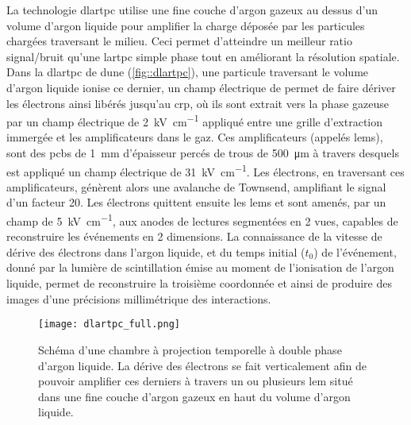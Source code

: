     La technologie \gls{dlartpc} utilise une fine couche d'argon gazeux au dessus d'un volume d'argon liquide pour amplifier la charge déposée par les particules chargées traversant le milieu. Ceci permet d'atteindre un meilleur ratio signal/bruit qu'une \gls{lartpc} simple phase tout en améliorant la résolution spatiale. Dans la \gls{dlartpc} de \gls{dune} (\autoref{fig::dlartpc}), une particule traversant le volume d'argon liquide ionise ce dernier, un champ électrique de \driftfield{} permet de faire dériver les électrons ainsi libérés jusqu'au \gls{crp}, où ils sont extrait vers la phase gazeuse par un champ électrique de \SI{2}{\kilo\volt\per\centi\meter} appliqué entre une grille d'extraction immergée et les amplificateurs dans le gaz. Ces amplificateurs (appelés \glspl{lem}), sont des \glspl{pcb} de \SI{1}{\milli\meter} d'épaisseur percés de trous de \SI{500}{\micro\meter} à travers desquels est appliqué un champ électrique de  \SI{31}{\kilo\volt\per\centi\meter}. Les électrons, en traversant ces amplificateurs, génèrent alors une avalanche de Townsend, amplifiant le signal d'un facteur 20. Les électrons quittent ensuite les \glspl{lem} et sont amenés, par un champ de  \SI{5}{\kilo\volt\per\centi\meter}, aux anodes de lectures segmentées en 2 vues, capables de reconstruire les événements en 2 dimensions. La connaissance de la vitesse de dérive des électrons dans l'argon liquide, et du temps initial ($t_0$) de l'événement, donné par la lumière de scintillation émise au moment de l'ionisation de l'argon liquide, permet de reconstruire la troisième coordonnée et ainsi de produire des images d'une précisions millimétrique des interactions.

    \begin{figure}[!htb]
      \centering
      \texttt{[image: dlartpc\_full.png]}
      \caption[Schéma d'une chambre à projection temporelle à double phase d'argon liquide]{\label{fig::dlartpc}Schéma d'une chambre à projection temporelle à double phase d'argon liquide. La dérive des électrons se fait verticalement afin de pouvoir amplifier ces derniers à travers un ou plusieurs \acrfull{lem} situé dans une fine couche d'argon gazeux en haut du volume d'argon liquide.}
    \end{figure}
    
